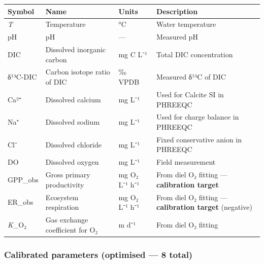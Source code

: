 \documentclass[
  letterpaper,
  DIV=11,
  numbers=noendperiod]{scrartcl}
\newcounter{none} %
\begin{document}
{\def\LTcaptype{none} %
\begin{longtable}[]{@{}
  >{\raggedright\arraybackslash}p{}
  >{\raggedright\arraybackslash}p{}
  >{\raggedright\arraybackslash}p{}
  >{\raggedright\arraybackslash}p{}@{}}
\toprule\noalign{}
\begin{minipage}[b]{\linewidth}\raggedright
Symbol
\end{minipage} & \begin{minipage}[b]{\linewidth}\raggedright
Name
\end{minipage} & \begin{minipage}[b]{\linewidth}\raggedright
Units
\end{minipage} & \begin{minipage}[b]{\linewidth}\raggedright
Description
\end{minipage} \\
\midrule\noalign{}
\endhead
\bottomrule\noalign{}
\endlastfoot
\emph{T} & Temperature & °C & Water temperature \\
pH & pH & --- & Measured pH \\
DIC & Dissolved inorganic carbon & mg C L⁻¹ & Total DIC concentration \\
δ¹³C-DIC & Carbon isotope ratio of DIC & ‰ VPDB & Measured δ¹³C of
DIC \\
Ca²⁺ & Dissolved calcium & mg L⁻¹ & Used for Calcite SI in PHREEQC \\
Na⁺ & Dissolved sodium & mg L⁻¹ & Used for charge balance in PHREEQC \\
Cl⁻ & Dissolved chloride & mg L⁻¹ & Fixed conservative anion in
PHREEQC \\
DO & Dissolved oxygen & mg L⁻¹ & Field measurement \\
GPP\_obs & Gross primary productivity & mg O₂ L⁻¹ h⁻¹ & From diel O₂
fitting --- \textbf{calibration target} \\
ER\_obs & Ecosystem respiration & mg O₂ L⁻¹ h⁻¹ & From diel O₂ fitting
--- \textbf{calibration target} (negative) \\
\emph{K}\_O₂ & Gas exchange coefficient for O₂ & m d⁻¹ & From diel O₂
fitting \\
\end{longtable}
}

\subsubsection{Calibrated parameters (optimised --- 8
total)}\label{calibrated-parameters-optimised-8-total}
\end{document}
